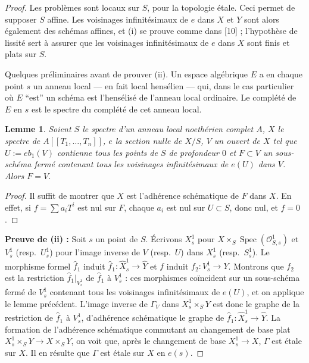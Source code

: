 \documentclass[12pt,a4paper]{article}
\theoremstyle{plain}
\newtheorem{lemma}[theorem]{Lemme}
\theoremstyle{definition}
\theoremstyle{remark}
\DeclareMathOperator{\Spec}{Spec}
\newcommand{\cO}{\mathcal{O}}
\begin{document}
\begin{proof}
Les problèmes sont locaux sur $S$, pour la topologie étale. Ceci permet de supposer $S$ affine. Les voisinages infinitésimaux de $e$ dans $X$ et $Y$ sont alors également des schémas affines, et (i) se prouve comme dans [10] ; l'hypothèse de lissité sert à assurer que les voisinages infinitésimaux de $e$ dans $X$ sont finis et plats sur $S$.

Quelques préliminaires avant de prouver (ii). Un espace algébrique $E$ a en chaque point $s$ un anneau local --- en fait local hensélien --- qui, dans le cas particulier où $E$ ``est'' un schéma est l'hensélisé de l'anneau local ordinaire. Le complété de $E$ en $s$ est le spectre du complété de cet anneau local.

\begin{lemma}
Soient $S$ le spectre d'un anneau local noethérien complet $A$, $X$ le spectre de $A[[T_1, \ldots, T_n]]$, $e$ la section nulle de $X/S$, $V$ un ouvert de $X$ tel que $U := eb_1(V)$ contienne tous les points de $S$ de profondeur $0$ et $F \subset V$ un sous-schéma fermé contenant tous les voisinages infinitésimaux de $e(U)$ dans $V$. Alors $F = V$.
\end{lemma}

\begin{proof}
Il suffit de montrer que $X$ est l'adhérence schématique de $F$ dans $X$. En effet, si $f = \sum a_i T^i$ est nul sur $F$, chaque $a_i$ est nul sur $U \subset S$, donc nul, et $f = 0$.
\end{proof}

\textbf{Preuve de (ii) :} Soit $s$ un point de $S$. Écrivons $X_s^1$ pour $X \times_S \Spec(\cO_{S,s}^1)$ et $V_s^1$ (resp.~$U_s^1$) pour l'image inverse de $V$ (resp.~$U$) dans $X_s^1$ (resp.~$S_s^1$). Le morphisme formel $\hat{f}_1$ induit $\hat{f}_1 : \hat{X}_s^1 \to \hat{Y}$ et $f$ induit $f_2 : V_s^1 \to Y$. Montrons que $f_2$ est la restriction $\hat{f}_1|_{V_s^1}$ de $\hat{f}_1$ à $V_s^1$ : ces morphismes coïncident sur un sous-schéma fermé de $V_s^1$ contenant tous les voisinages infinitésimaux de $e(U)$, et on applique le lemme précédent. L'image inverse de $\Gamma_V$ dans $X_s^1 \times_S Y$ est donc le graphe de la restriction de $\hat{f}_1$ à $V_s^1$, d'adhérence schématique le graphe de $\hat{f}_1 : \hat{X}_s^1 \to \hat{Y}$. La formation de l'adhérence schématique commutant au changement de base plat $X_s^1 \times_S Y \to X \times_S Y$, on voit que, après le changement de base $X_s^1 \to X$, $\Gamma$ est étale sur $X$. Il en résulte que $\Gamma$ est étale sur $X$ en $e(s)$.
\end{proof}
\end{document}
